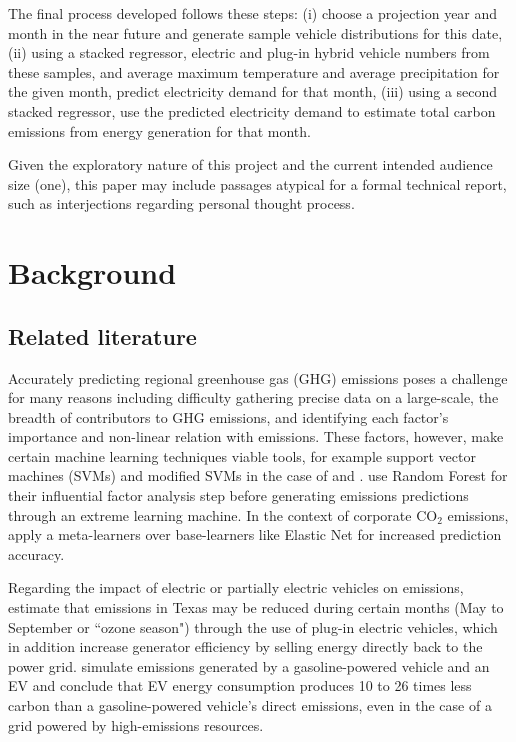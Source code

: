 \documentclass{article}
\begin{document}
The final process developed follows these steps: (i) choose a projection year and month in the near future and generate sample vehicle distributions for this date, (ii) using a stacked regressor, electric and plug-in hybrid vehicle numbers from these samples, and average maximum temperature and average precipitation for the given month, predict electricity demand for that month, (iii) using a second stacked regressor, use the predicted electricity demand to estimate total carbon emissions from energy generation for that month.

Given the exploratory nature of this project and the current intended audience size (one), this paper may include passages atypical for a formal technical report, such as interjections regarding personal thought process.

\section{Background}
\subsection{Related literature}
Accurately predicting regional greenhouse gas (GHG) emissions poses a challenge for many reasons including difficulty gathering precise data on a large-scale, the breadth of contributors to GHG emissions, and identifying each factor's importance and non-linear relation with emissions. These factors, however, make certain machine learning techniques viable tools, for example support vector machines (SVMs) and modified SVMs in the case of \cite{saleh:co2svm} and \cite{ehteram:co2svm}. \cite{wei:emissionsrf} use Random Forest for their influential factor analysis step before generating emissions predictions through an extreme learning machine. In the context of corporate CO\(_2\) emissions, \cite{nguyen:co2prediction} apply a meta-learners over base-learners like Elastic Net for increased prediction accuracy. 

Regarding the impact of electric or partially electric vehicles on emissions, \cite{sioshansi:pevimpact} estimate that emissions in Texas may be reduced during certain months (May to September or ``ozone season") through the use of plug-in electric vehicles, which in addition increase generator efficiency by selling energy directly back to the power grid. \cite{rodriguesteixeira:evemissions} simulate emissions generated by a gasoline-powered vehicle and an EV and conclude that EV energy consumption produces 10 to 26 times less carbon than a gasoline-powered vehicle's direct emissions, even in the case of a grid powered by high-emissions resources.
\end{document}
